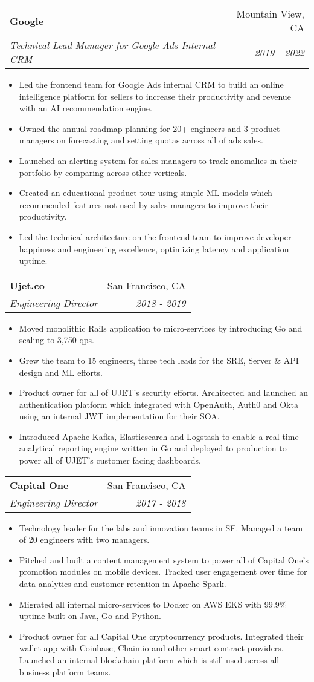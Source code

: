 \documentclass[letterpaper,11pt]{article}
\makeatletter
\newcommand{\resumeSubheading}[4]{
  \vspace{-1pt}\item
    \begin{tabular*}{0.97\textwidth}[t]{l@{\extracolsep{\fill}}r}
      \textbf{#1} & #2 \\
      \textit{\small#3} & \textit{\small #4} \\
    \end{tabular*}\vspace{-5pt}
}
\newcommand{\resumeItemListStart}{\begin{itemize}}
\newcommand{\resumeItemListEnd}{\end{itemize}\vspace{-5pt}}
\makeatother
\begin{document}
    \resumeSubheading
      {Google}{Mountain View, CA}
      {Technical Lead Manager for Google Ads Internal CRM}{2019 - 2022}
      \resumeItemListStart
        \item Led the frontend team for Google Ads internal CRM to build an online intelligence platform for sellers to increase their productivity and revenue with an AI recommendation engine.
        \item Owned the annual roadmap planning for 20+ engineers and 3 product managers on forecasting and setting quotas across all of ads sales.
        \item Launched an alerting system for sales managers to track anomalies in their portfolio by comparing across other verticals.
        \item Created an educational product tour using simple ML models which recommended features not used by sales managers to improve their productivity.
        \item Led the technical architecture on the frontend team to improve developer happiness and engineering excellence, optimizing latency and application uptime.
      \resumeItemListEnd

      \resumeSubheading
        {Ujet.co}{San Francisco, CA}
        {Engineering Director}{2018 - 2019}
      \resumeItemListStart
        \item Moved monolithic Rails application to micro-services by introducing Go and scaling to 3,750 qps.
        \item Grew the team to 15 engineers, three tech leads for the SRE, Server \& API design and ML efforts.
        \item Product owner for all of UJET’s security efforts. Architected and launched an authentication platform which integrated with OpenAuth, Auth0 and Okta using an internal JWT implementation for their SOA.
        \item Introduced Apache Kafka, Elasticsearch and Logstash to enable a real-time analytical reporting engine written in Go and deployed to production to power all of UJET’s customer facing dashboards.
      \resumeItemListEnd

    \pagebreak[3]

    \resumeSubheading
    {Capital One}{San Francisco, CA}
    {Engineering Director}{2017 - 2018}
    \resumeItemListStart
      \item Technology leader for the labs and innovation teams in SF. Managed a team of 20 engineers with two managers.
      \item Pitched and built a content management system to power all of Capital One’s promotion modules on mobile devices. Tracked user engagement over time for data analytics and customer retention in Apache Spark.
      \item Migrated all internal micro-services to Docker on AWS EKS with 99.9\% uptime built on Java, Go and Python.
      \item Product owner for all Capital One cryptocurrency products. Integrated their wallet app with Coinbase, Chain.io and other smart contract providers. Launched an internal blockchain platform which is still used across all business platform teams.
    \resumeItemListEnd
\end{document}
